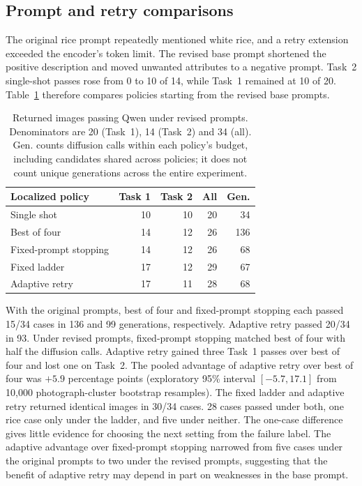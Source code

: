 \subsection{Prompt and retry comparisons}
The original rice prompt repeatedly mentioned white rice, and a retry extension exceeded the encoder's token limit. The revised base prompt shortened the positive description and moved unwanted attributes to a negative prompt. Task~2 single-shot passes rose from 0 to 10 of 14, while Task~1 remained at 10 of 20. Table~\ref{tab:policy} therefore compares policies starting from the revised base prompts.

\begin{table}[t]
\centering\small
\begin{tabular}{@{}lrrrr@{}}\toprule
Localized policy & Task 1 & Task 2 & All & Gen.\\\midrule
Single shot &10&10&20&34\\
Best of four &14&12&26&136\\
Fixed-prompt stopping &14&12&26&68\\
Fixed ladder &17&12&29&67\\
Adaptive retry &17&11&28&68\\\bottomrule
\end{tabular}
\caption{Returned images passing Qwen under revised prompts. Denominators are 20 (Task~1), 14 (Task~2) and 34 (all). Gen. counts diffusion calls within each policy's budget, including candidates shared across policies; it does not count unique generations across the entire experiment.}\label{tab:policy}
\end{table}

With the original prompts, best of four and fixed-prompt stopping each passed 15/34 cases in 136 and 99 generations, respectively. Adaptive retry passed 20/34 in 93. Under revised prompts, fixed-prompt stopping matched best of four with half the diffusion calls. Adaptive retry gained three Task~1 passes over best of four and lost one on Task~2. The pooled advantage of adaptive retry over best of four was $+5.9$ percentage points (exploratory 95\% interval $[-5.7,17.1]$ from 10,000 photograph-cluster bootstrap resamples). The fixed ladder and adaptive retry returned identical images in 30/34 cases. 28 cases passed under both, one rice case only under the ladder, and five under neither. The one-case difference gives little evidence for choosing the next setting from the failure label. The adaptive advantage over fixed-prompt stopping narrowed from five cases under the original prompts to two under the revised prompts, suggesting that the benefit of adaptive retry may depend in part on weaknesses in the base prompt.

